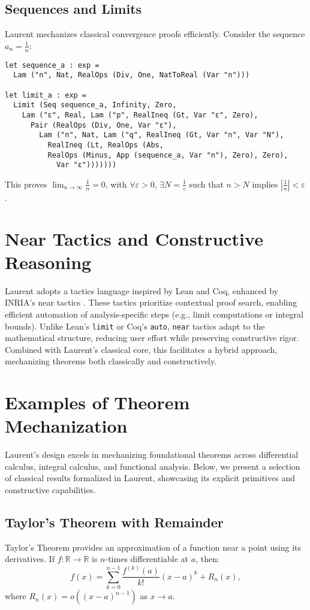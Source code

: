 \documentclass[12pt,twoside,draft]{cmpart}
\begin{document}
\subsection{Sequences and Limits}
Laurent mechanizes classical convergence proofs efficiently. Consider the sequence $a_n = \frac{1}{n}$:
\begin{verbatim}
let sequence_a : exp =
  Lam ("n", Nat, RealOps (Div, One, NatToReal (Var "n")))

let limit_a : exp =
  Limit (Seq sequence_a, Infinity, Zero,
    Lam ("ε", Real, Lam ("p", RealIneq (Gt, Var "ε", Zero),
      Pair (RealOps (Div, One, Var "ε"),
        Lam ("n", Nat, Lam ("q", RealIneq (Gt, Var "n", Var "N"),
          RealIneq (Lt, RealOps (Abs,
          RealOps (Minus, App (sequence_a, Var "n"), Zero), Zero),
            Var "ε")))))))
\end{verbatim}
This proves $\lim_{n \to \infty} \frac{1}{n} = 0$, with $\forall \varepsilon > 0$, $\exists N = \frac{1}{\varepsilon}$ such that $n > N$ implies $\left| \frac{1}{n} \right| < \varepsilon$.

\section{Near Tactics and Constructive Reasoning}
Laurent adopts a tactics language inspired by Lean and Coq, enhanced by INRIA’s
near tactics \cite{af18}. These tactics prioritize contextual proof search,
enabling efficient automation of analysis-specific steps (e.g., limit computations
or integral bounds). Unlike Lean’s \texttt{limit} or Coq’s \texttt{auto}, \texttt{near}
tactics adapt to the mathematical structure, reducing user effort while preserving
constructive rigor. Combined with Laurent’s classical core, this facilitates a
hybrid approach, mechanizing theorems both classically and constructively.

\section{Examples of Theorem Mechanization}
Laurent’s design excels in mechanizing foundational theorems across differential calculus, integral calculus, and functional analysis. Below, we present a selection of classical results formalized in Laurent, showcasing its explicit primitives and constructive capabilities.

\subsection{Taylor’s Theorem with Remainder}
Taylor’s Theorem provides an approximation of a function near a point using its derivatives. If $f : \mathbb{R} \to \mathbb{R}$ is $n$-times differentiable at $a$, then:
\[
f(x) = \sum_{k=0}^{n-1} \frac{f^{(k)}(a)}{k!} (x - a)^k + R_n(x),
\]
where $R_n(x) = o((x - a)^{n-1})$ as $x \to a$. 
\end{document}
